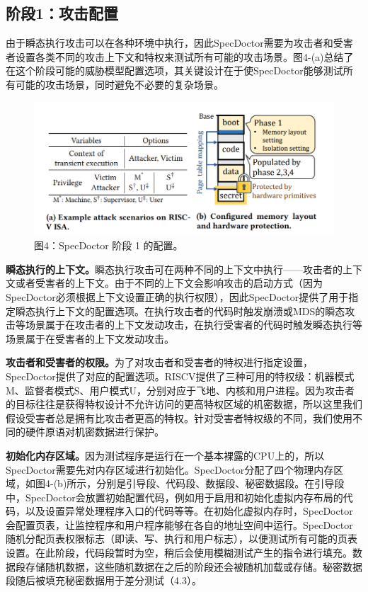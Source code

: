 \subsection{阶段1：攻击配置}

由于瞬态执行攻击可以在各种环境中执行，因此SpecDoctor需要为攻击者和受害者设置各类不同的攻击上下文和特权来测试所有可能的攻击场景。图4-(a)总结了在这个阶段可能的威胁模型配置选项，其关键设计在于使SpecDoctor能够测试所有可能的攻击场景，同时避免不必要的复杂场景。\par

\begin{figure}[!h]
    \centering
    \includegraphics[width=\linewidth]{figure/proposal/specdoctor-figure4.png}
    \caption*{图4：SpecDoctor 阶段 1 的配置。}
\end{figure}

\textbf{瞬态执行的上下文。}瞬态执行攻击可在两种不同的上下文中执行——攻击者的上下文或者受害者的上下文。由于不同的上下文会影响攻击的启动方式（因为SpecDoctor必须根据上下文设置正确的执行权限），因此SpecDoctor提供了用于指定瞬态执行上下文的配置选项。在执行攻击者的代码时触发崩溃或MDS的瞬态攻击等场景属于在攻击者的上下文发动攻击，在执行受害者的代码时触发瞬态执行等场景属于在受害者的上下文发动攻击。\par

\textbf{攻击者和受害者的权限。}为了对攻击者和受害者的特权进行指定设置，SpecDoctor提供了对应的配置选项。RISCV提供了三种可用的特权级：机器模式M、监督者模式S、用户模式U，分别对应于飞地、内核和用户进程。因为攻击者的目标往往是获得特权设计不允许访问的更高特权区域的机密数据，所以这里我们假设受害者总是拥有比攻击者更高的特权。针对受害者特权级的不同，我们使用不同的硬件原语对机密数据进行保护。\par

\textbf{初始化内存区域。}因为测试程序是运行在一个基本裸露的CPU上的，所以SpecDoctor需要先对内存区域进行初始化。SpecDoctor分配了四个物理内存区域，如图4-(b)所示，分别是引导段、代码段、数据段、秘密数据段。在引导段中，SpecDoctor会放置初始配置代码，例如用于启用和初始化虚拟内存布局的代码，以及设置异常处理程序入口的代码等等。在初始化虚拟内存时，SpecDoctor会配置页表，让监控程序和用户程序能够在各自的地址空间中运行。SpecDoctor随机分配页表权限标志（即读、写、执行和用户标志），以便测试所有可能的页表设置。在此阶段，代码段暂时为空，稍后会使用模糊测试产生的指令进行填充。数据段存储随机数据，这些随机数据在之后的阶段还会被随机加载或存储。秘密数据段随后被填充秘密数据用于差分测试（4.3）。\par

